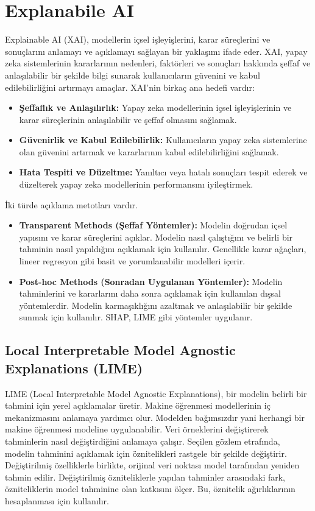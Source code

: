 \section{Explanabile AI}
Explainable AI (XAI), modellerin içsel işleyişlerini, karar süreçlerini ve sonuçlarını anlamayı ve açıklamayı sağlayan bir yaklaşımı ifade eder. XAI, yapay zeka sistemlerinin kararlarının nedenleri, faktörleri ve sonuçları hakkında şeffaf ve anlaşılabilir bir şekilde bilgi sunarak kullanıcıların güvenini ve kabul edilebilirliğini artırmayı amaçlar. XAI'nin birkaç ana hedefi vardır:
\begin{itemize}
    \item \textbf{Şeffaflık ve Anlaşılırlık:} Yapay zeka modellerinin içsel işleyişlerinin ve karar süreçlerinin anlaşılabilir ve şeffaf olmasını sağlamak.
    \item \textbf{Güvenirlik ve Kabul Edilebilirlik:} Kullanıcıların yapay zeka sistemlerine olan güvenini artırmak ve kararlarının kabul edilebilirliğini sağlamak.
    \item \textbf{Hata Tespiti ve Düzeltme:} Yanıltıcı veya hatalı sonuçları tespit ederek ve düzelterek yapay zeka modellerinin performansını iyileştirmek.
\end{itemize}

İki türde açıklama metotları vardır.
\begin{itemize}
    \item \textbf{Transparent Methods (Şeffaf Yöntemler):} Modelin doğrudan içsel yapısını ve karar süreçlerini açıklar. Modelin nasıl çalıştığını ve belirli bir tahminin nasıl yapıldığını açıklamak için kullanılır. Genellikle karar ağaçları, lineer regresyon gibi basit ve yorumlanabilir modelleri içerir.
    \item \textbf{Post-hoc Methods (Sonradan Uygulanan Yöntemler):} Modelin tahminlerini ve kararlarını daha sonra açıklamak için kullanılan dışsal yöntemlerdir. Modelin karmaşıklığını azaltmak ve anlaşılabilir bir şekilde sunmak için kullanılır. SHAP, LIME gibi yöntemler uygulanır.
\end{itemize}

\newpage

\subsection{Local Interpretable Model Agnostic Explanations (LIME)}
LIME (Local Interpretable Model Agnostic Explanations), bir modelin belirli bir tahmini için yerel açıklamalar üretir. Makine öğrenmesi modellerinin iç mekanizmasını anlamaya yardımcı olur. Modelden bağımsızdır yani herhangi bir makine öğrenmesi modeline uygulanabilir. Veri örneklerini değiştirerek tahminlerin nasıl değiştirdiğini anlamaya çalışır. Seçilen gözlem etrafında, modelin tahminini açıklamak için öznitelikleri rastgele bir şekilde değiştirir. Değiştirilmiş özelliklerle birlikte, orijinal veri noktası model tarafından yeniden tahmin edilir.  Değiştirilmiş özniteliklerle yapılan tahminler arasındaki fark, özniteliklerin model tahminine olan katkısını ölçer. Bu, öznitelik ağırlıklarının hesaplanması için kullanılır.

